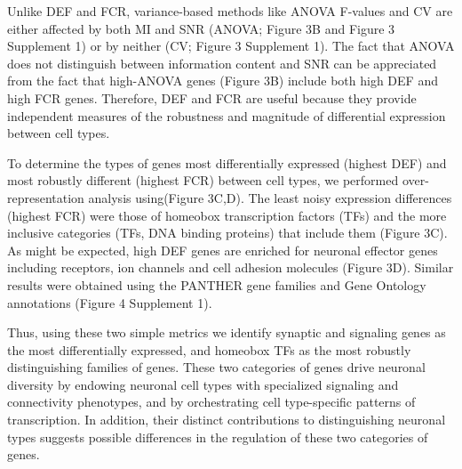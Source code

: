 Unlike DEF and FCR, variance-based methods like ANOVA F-values and CV are either affected by both MI and SNR (ANOVA; Figure 3B and Figure 3 Supplement 1) or by neither (CV; Figure 3 Supplement 1). The fact that ANOVA does not distinguish between information content and SNR can be appreciated from the fact that high-ANOVA genes (Figure 3B) include both high DEF and high FCR genes. Therefore, DEF and FCR are useful because they provide independent measures of the robustness and magnitude of differential expression between cell types.

To determine the types of genes most differentially expressed (highest DEF) and most robustly different (highest FCR) between cell types, we performed over-representation analysis using(Figure 3C,D). The least noisy expression differences (highest FCR) were those of homeobox transcription factors (TFs) and the more inclusive categories (TFs, DNA binding proteins) that include them (Figure 3C). As might be expected, high DEF genes are enriched for neuronal effector genes including receptors, ion channels and cell adhesion molecules (Figure 3D). Similar results were obtained using the PANTHER gene families \citep{Mi_2016} and Gene Ontology annotations\cite{Ashburner_2000} (Figure 4 Supplement 1).  

Thus, using these two simple metrics we identify synaptic and signaling genes as the most differentially expressed, and homeobox TFs as the most robustly distinguishing families of genes. These two categories of genes drive neuronal diversity by endowing neuronal cell types with specialized signaling and connectivity phenotypes, and by orchestrating cell type-specific patterns of transcription. In addition, their distinct contributions to distinguishing neuronal types suggests possible differences in the regulation of these two categories of genes. 


